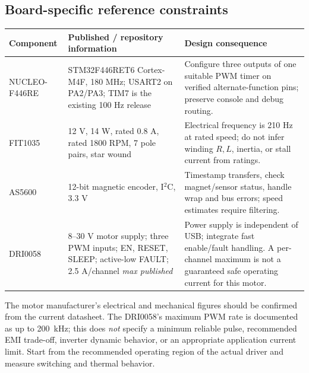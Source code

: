 \documentclass[10pt,letterpaper]{article}
\begin{document}
\subsection{Board-specific reference constraints}
\begin{center}
\begin{tabularx}{\linewidth}{@{}p{30mm}p{48mm}X@{}}\toprule
Component & Published / repository information & Design consequence\\\midrule
NUCLEO-F446RE & STM32F446RET6 Cortex-M4F, 180 MHz; USART2 on PA2/PA3; TIM7 is the existing 100 Hz release & Configure three outputs of one suitable PWM timer on verified alternate-function pins; preserve console and debug routing.\\
FIT1035 & 12 V, 14 W, rated 0.8 A, rated 1800 RPM, 7 pole pairs, star wound & Electrical frequency is 210 Hz at rated speed; do not infer winding $R,L$, inertia, or stall current from ratings.\\
AS5600 & 12-bit magnetic encoder, I$^2$C, 3.3 V & Timestamp transfers, check magnet/sensor status, handle wrap and bus errors; speed estimates require filtering.\\
DRI0058 & 8--30 V motor supply; three PWM inputs; EN, RESET, SLEEP; active-low FAULT; 2.5 A/channel \emph{max published} & Power supply is independent of USB; integrate fast enable/fault handling. A per-channel maximum is not a guaranteed safe operating current for this motor.\\\bottomrule
\end{tabularx}
\end{center}
The motor manufacturer's electrical and mechanical figures should be confirmed from the current datasheet. The DRI0058's maximum PWM rate is documented as up to \SI{200}{kHz}; this does \emph{not} specify a minimum reliable pulse, recommended EMI trade-off, inverter dynamic behavior, or an appropriate application current limit. Start from the recommended operating region of the actual driver and measure switching and thermal behavior.
\end{document}

